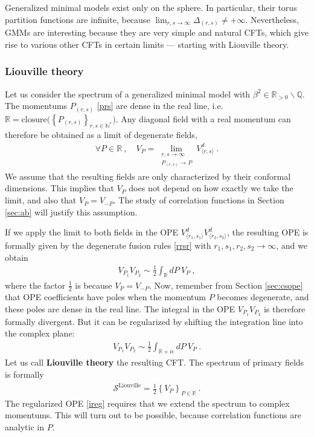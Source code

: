 \documentclass[12pt, a4paper]{article}
\newcommand{\myindex}[1]{\textbf{\boldmath #1}}
\begin{document}
Generalized minimal models exist only on the sphere. In particular, their torus partition functions are infinite, because $\lim_{r,s\to\infty} \Delta_{(r,s)}\neq +\infty$. Nevertheless, GMMs are interesting because they are very simple and natural CFTs, which give rise to various other CFTs in certain limits --- starting with Liouville theory.

\subsubsection{Liouville theory}\label{sec:liou}

Let us consider the spectrum of a generalized minimal model with $\beta^2\in\mathbb{R}_{>0}\backslash\mathbb{Q}$. The momentums $P_{(r,s)}$ \eqref{prs} are dense in the real line, i.e. $\mathbb{R}=\text{closure}\big(\left\{ P_{(r,s)}\right\}_{r,s\in\mathbb{N}^*}\big)$. Any diagonal field with a real momentum can therefore be obtained as a limit of degenerate fields,
\begin{align}
 \forall P\in\mathbb{R}\ , \quad V_P = \lim_{\substack{r,s\to\infty \\ P_{(r,s)}\to P}} V^d_{\langle r,s\rangle}\ .
 \label{vplim}
\end{align}
We assume that the resulting fields are only characterized by their conformal dimensions. This implies that $V_P$ does not depend on how exactly we take the limit, and also that $V_P=V_{-P}$. The study of correlation functions in Section \ref{sec:ab} will justify this assumption.

If we apply the limit to both fields in the OPE $V^d_{\langle r_1,s_1\rangle}V^d_{\langle r_2,s_2\rangle}$, the resulting OPE is formally given by the degenerate fusion rules \eqref{rrsr} with $r_1,s_1,r_2,s_2\to\infty$, and we obtain
\begin{align}
 \boxed{V_{P_1}V_{P_2} \sim \frac12 \int_\mathbb{R} dP\ V_P} \ ,
 \label{idpv}
\end{align}
where the factor $\frac12$ is because $V_P=V_{-P}$. Now, remember from Section \ref{sec:csope} that OPE coefficients have poles when the momentum $P$ becomes degenerate, and these poles are dense in the real line. The integral in the OPE $V_{P_1}V_{P_2}$ is therefore formally divergent. But it can be regularized by shifting the integration line into the complex plane:
\begin{align}
 V_{P_1}V_{P_2} \sim \frac12 \int_{\mathbb{R}+i\epsilon} dP\ V_P\ .
 \label{ireg}
\end{align}
Let us call \myindex{Liouville theory} the resulting CFT. The spectrum of primary fields is formally
\begin{align}
 \boxed{\mathcal{S}^\text{Liouville} = \frac12 \left\{ V_P\right\}_{P\in \mathbb{R}}}\ .
 \label{sliou}
\end{align}
The regularized OPE \eqref{ireg} requires that we extend the spectrum to complex momentums. This will turn out to be possible, because correlation functions are analytic in $P$. 
\end{document}
